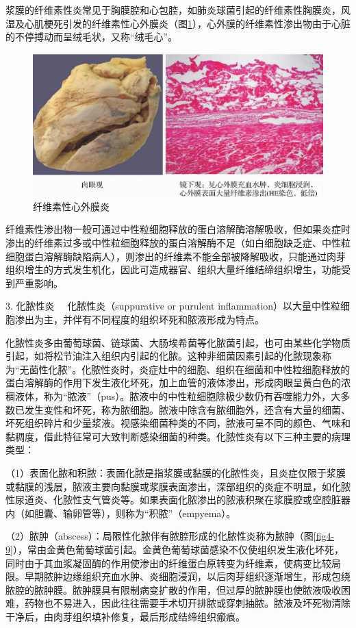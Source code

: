 浆膜的纤维素性炎常见于胸膜腔和心包腔，如肺炎球菌引起的纤维素性胸膜炎，风湿及心肌梗死引发的纤维素性心外膜炎（图\ref{fig4-8}），心外膜的纤维素性渗出物由于心脏的不停搏动而呈绒毛状，又称``绒毛心''。

\begin{figure}[!htbp]
 \centering
 \includegraphics{./images/Image00059.jpg}
 \caption{纤维素性心外膜炎}
 \label{fig4-8}
  \end{figure} 

纤维素性渗出物一般可通过中性粒细胞释放的蛋白溶解酶溶解吸收，但如果炎症时渗出的纤维素过多或中性粒细胞释放的蛋白溶解酶不足（如白细胞缺乏症、中性粒细胞蛋白溶解酶缺陷病人），则渗出的纤维素不能全部被降解吸收，只能通过肉芽组织增生的方式发生机化，因此可造成器官、组织大量纤维结缔组织增生，功能受到严重影响。

{3. 化脓性炎} 　化脓性炎（suppurative or purulent
inflammation）以大量中性粒细胞渗出为主，并伴有不同程度的组织坏死和脓液形成为特点。

化脓性炎多由葡萄球菌、链球菌、大肠埃希菌等化脓菌引起，也可由某些化学物质引起，如将松节油注入组织内引起的化脓。这种非细菌因素引起的化脓现象称为``无菌性化脓''。化脓性炎时，炎症灶中的细胞、组织在细菌和中性粒细胞释放的蛋白溶解酶的作用下发生液化坏死，加上血管的液体渗出，形成肉眼呈黄白色的浓稠液体，称为``脓液''（pus）。脓液中的中性粒细胞除极少数仍有吞噬能力外，大多数已发生变性和坏死，称为脓细胞。脓液中除含有脓细胞外，还含有大量的细菌、坏死组织碎片和少量浆液。视感染细菌种类的不同，脓液可呈不同的颜色、气味和黏稠度，借此特征常可大致判断感染细菌的种类。化脓性炎有以下三种主要的病理类型：

（1）表面化脓和积脓：表面化脓是指浆膜或黏膜的化脓性炎，且炎症仅限于浆膜或黏膜的浅层，脓液主要向黏膜或浆膜表面渗出，深部组织的炎症不明显，如化脓性尿道炎、化脓性支气管炎等。如果表面化脓渗出的脓液积聚在浆膜腔或空腔脏器内（如胆囊、输卵管等），则称为``积脓''（empyema）。

（2）脓肿（abscess）：局限性化脓伴有脓腔形成的化脓性炎称为脓肿（图\ref{fig4-9}），常由金黄色葡萄球菌引起。金黄色葡萄球菌感染不仅使组织发生液化坏死，同时由于其血浆凝固酶的作用使渗出的纤维蛋白原转变为纤维素，使病变比较局限。早期脓肿边缘组织充血水肿、炎细胞浸润，以后肉芽组织逐渐增生，形成包绕脓腔的脓肿膜。脓肿膜具有限制病变扩散的作用，但过厚的脓肿膜也使脓液吸收困难，药物也不易进入，因此往往需要手术切开排脓或穿刺抽脓。脓液及坏死物清除干净后，由肉芽组织填补修复，最后形成结缔组织瘢痕。

